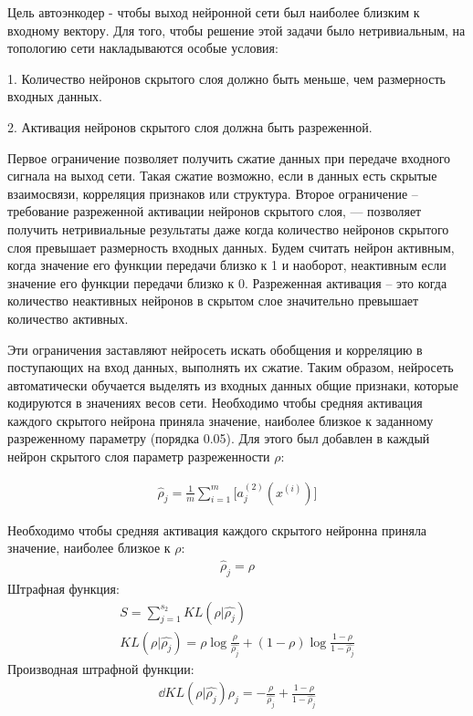 \documentclass[12pt]{article}
\begin{document}
Цель автоэнкодер - чтобы выход нейронной сети был наиболее близким к входному вектору. Для того, чтобы решение этой задачи было нетривиальным, на топологию сети накладываются особые условия: 

1. Количество нейронов скрытого слоя должно быть меньше, чем размерность входных данных.

2. Активация нейронов скрытого слоя должна быть разреженной.

Первое ограничение позволяет получить сжатие данных при передаче входного сигнала на выход сети. Такая сжатие возможно, если в данных есть скрытые взаимосвязи, корреляция признаков или структура. Второе ограничение – требование разреженной активации нейронов скрытого слоя, — позволяет получить нетривиальные результаты даже когда количество нейронов скрытого слоя превышает размерность входных данных. Будем считать нейрон активным, когда значение его функции передачи близко к 1 и наоборот, неактивным если значение его функции передачи близко к 0. Разреженная активация – это когда количество неактивных нейронов в скрытом слое значительно превышает количество активных.

Эти ограничения заставляют нейросеть искать обобщения и корреляцию в поступающих на вход данных, выполнять их сжатие. Таким образом, нейросеть автоматически обучается выделять из входных данных общие признаки, которые кодируются в значениях весов сети. Необходимо чтобы средняя активация каждого скрытого нейрона приняла значение, наиболее близкое к заданному разреженному параметру (порядка 0.05). Для этого был добавлен в каждый нейрон скрытого слоя параметр разреженности $\rho$:

  \begin{align}
	\hat \rho_j=\frac{1}{m}\sum_{i=1}^m\biggl[a^{(2)}_j(x^{(i)})\biggl]
  \end{align}

Необходимо чтобы средняя активация каждого скрытого нейронна приняла значение, наиболее близкое к $\rho$:
  \begin{align}
	\hat \rho_j=\rho
  \end{align}
  Штрафная функция:
  \begin{align}
	S=\sum_{j=1}^{s_2}{KL({\rho}|{\hat{\rho_j}})}\\
	KL({\rho}|{\hat{\rho_j}})=\rho\log{\frac{\rho}{\hat{\rho_j}}}+(1-\rho)\log{\frac{1-\rho}{1-\hat{\rho_j}}}
  \end{align}
  Производная штрафной функции:
  \begin{align}
	\dd{KL({\rho}|{\hat{\rho_j}})}{\rho_j}=-\frac{\rho}{\hat{\rho_j}} + \frac{1-\rho}{1-\hat{\rho_j}}
  \end{align}
\end{document}
